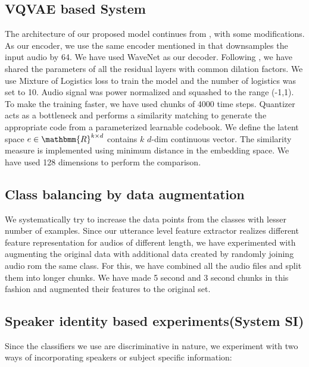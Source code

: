 \subsection{VQVAE based System}
The architecture of our proposed model continues from \cite{unsupervised_representation_learning_wavenet_autoencoders}, with some modifications. As our encoder, we use the same encoder mentioned in \cite{unsupervised_representation_learning_wavenet_autoencoders} that downsamples the input audio by 64. We have used WaveNet\cite{van2016wavenet} as our decoder. Following \cite{strubell2017fast}, we have shared the parameters of all the residual layers with common dilation factors. We use Mixture of Logistics loss to train the model and the number of logistics was set to 10. Audio signal was power normalized and squashed to the range (-1,1). To make the training faster, we have used chunks of 4000 time steps.  Quantizer acts as a bottleneck and  performs a similarity matching to generate the appropriate code from a parameterized learnable codebook. We define the latent space $e \in \mathbmm{R}^{k\times d}$ contains $k$ $d$-dim continuous vector. The similarity measure is implemented using minimum distance in the embedding space. We have used 128 dimensions to perform the comparison.  



\subsection{Class balancing by data augmentation}

We systematically try to increase the data points from the classes with lesser number of examples. Since our utterance level feature extractor realizes different feature representation for audios of different length, we have experimented with augmenting the original data with additional data created by randomly joining audio rom the same class. For this, we have combined all the audio files and split them into longer chunks. We have made 5 second and 3 second chunks in this fashion and augmented their features to the original set. 


\subsection{Speaker identity based experiments(System SI)}

Since the classifiers we use are discriminative in nature, we experiment with  two ways of incorporating speakers or subject specific information: 

